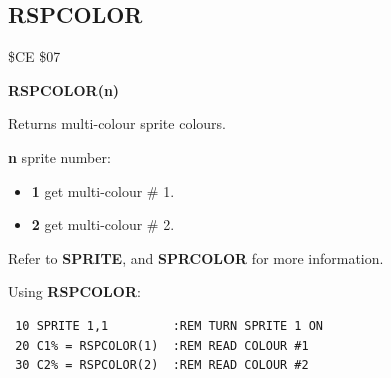\subsection{RSPCOLOR}
\begin{description}[leftmargin=2cm,style=nextline]
\item [Token:] \$CE \$07
\item [Format:] {\bf RSPCOLOR(n)}
\item [Usage:]  Returns multi-colour sprite colours.

                {\bf n} sprite number:

                \begin{itemize}
                    \item {\bf 1} get multi-colour \# 1.
                    \item {\bf 2} get multi-colour \# 2.
                \end{itemize}

\item [Remarks:] Refer to {\bf SPRITE}, and {\bf SPRCOLOR} for more information.

\item [Example:] Using {\bf RSPCOLOR}:
\begin{tcolorbox}[colback=black,coltext=white]
\verbatimfont{\codefont}
\begin{verbatim}
 10 SPRITE 1,1         :REM TURN SPRITE 1 ON
 20 C1% = RSPCOLOR(1)  :REM READ COLOUR #1
 30 C2% = RSPCOLOR(2)  :REM READ COLOUR #2
\end{verbatim}
\end{tcolorbox}
\end{description}


\newpage

